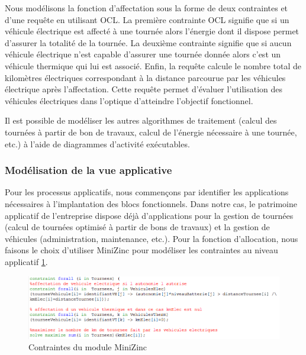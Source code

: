 Nous modélisons la fonction d'affectation sous la
forme de deux contraintes et d'une requête en utilisant OCL. La première contrainte OCL signifie
que si un véhicule électrique est affecté à une tournée alors l'énergie dont il
dispose permet d'assurer la totalité de la tournée. La deuxième contrainte
signifie que si aucun véhicule électrique n'est capable d'assurer une tournée
donnée alors c'est un véhicule thermique qui lui est associé. Enfin, la requête
calcule le nombre total de kilomètres électriques correspondant à la distance
parcourue par les véhicules électrique après l'affectation. Cette requête permet
d'évaluer l'utilisation  des véhicules électriques dans l'optique d'atteindre
l'objectif fonctionnel.

Il est possible de modéliser les autres algorithmes de
traitement (calcul des tournées à partir de bon de travaux, calcul de l'énergie
nécessaire à une tournée, etc.) à l'aide de diagrammes d'activité exécutables.





\subsubsection{Modélisation de la vue applicative}

Pour les processus applicatifs, nous commençons par identifier  les applications
nécessaires à l'implantation des blocs fonctionnels. Dans notre cas, le
patrimoine applicatif de l'entreprise dispose déjà d'applications pour la
gestion de tournées (calcul de tournées optimisé à partir de bons de travaux) et
la gestion de véhicules (administration, maintenance, etc.). Pour la fonction
d'allocation, nous faisons le choix d'utiliser MiniZinc pour modéliser les
contraintes au niveau applicatif \ref{fig:contraintesMiniZinc}.

\begin{figure}[!htbp]
 \begin{center}
  \includegraphics[width=1\textwidth]{figures/5_implementation/module_minizinc.png}
 \end{center}
 \caption{Contraintes du module MiniZinc}
 \label{fig:contraintesMiniZinc}
\end{figure} 


